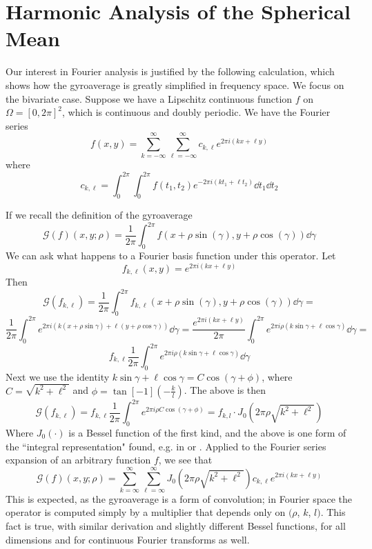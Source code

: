 \section{Harmonic Analysis of the Spherical Mean \label{sec:Harmonic2}}
Our interest in Fourier analysis is justified by the following calculation, which shows how the gyroaverage is greatly simplified in frequency space.  We focus on the bivariate case.  Suppose we have a Lipschitz continuous function $f$ on $\Omega = [0,2\pi]^2$, which is continuous and doubly periodic.  We have the Fourier series
\[ f(x,y) = \sum_{k=-\infty}^{\infty} \sum_{\ell = -\infty}^{\infty} c_{k,\ell} e^{2 \pi i (kx+\ell y)}  \]
where
\[ c_{k,\ell} = \int_{0}^{2 \pi} \int_{0}^{2 \pi} f(t_1,t_2) e^{-2 \pi i (kt_1 + \ell t_2)} \dd{t_1} \dd{t_2}\]

If we recall the definition of the gyroaverage
\[ \mathcal{G}(f)(x,y;\rho) = \frac{1}{2 \pi}\int_{0}^{2\pi} f(x+\rho \sin(\gamma), y + \rho \cos(\gamma)) \dd{\gamma}\]
We can ask what happens to a Fourier basis function under this operator.  Let
\[ f_{k, \ell} (x,y) = e^{2 \pi i (kx+\ell y)}   \]
Then
\[ \mathcal{G}(f_{k,\ell}) = \frac{1}{2 \pi}  \int_{0}^{2\pi} f_{k,\ell}(x+\rho \sin(\gamma), y + \rho \cos(\gamma)) \dd{\gamma} =  \]
\[  \frac{1}{2 \pi}  \int_{0}^{2\pi} e^{2 \pi i (k(x + \rho \sin \gamma) + \ell(y + \rho \cos \gamma))} \dd{\gamma} =   \frac{e^{2 \pi i (kx + \ell y)}}{2 \pi}\int_{0}^{2\pi} e^{2 \pi i \rho (k \sin \gamma + \ell \cos \gamma)} \dd{\gamma} =   \]
\[ f_{k,\ell} \frac{1}{2 \pi}\int_{0}^{2\pi} e^{2 \pi i \rho (k \sin \gamma + \ell \cos \gamma)} \dd{\gamma} \]
Next we use the identity $k \sin \gamma + \ell \cos \gamma = C \cos (\gamma + \phi)$, where $C = \sqrt{k^2 + \ell^2}$ and $\phi = \tan[-1](-\frac{k}{l})$.  The above is then 
\[ \mathcal{G}(f_{k,\ell}) = f_{k,\ell} \frac{1}{2 \pi} \int_{0}^{2 \pi} e^{2 \pi i \rho C \cos(\gamma + \phi)} = f_{k,l}  \cdot J_0(2 \pi \rho \sqrt{k^2 + \ell^2}) \]
Where $J_0(\cdot)$ is a Bessel function of the first kind, and the above is one form of the ``integral representation" found, e.g. in \cite{wikipediaBesselFunction} or \cite[Eq ~10.9.17]{NIST:DLMF}. 
Applied to the Fourier series expansion of an arbitrary function $f$, we see that
\[\mathcal{G}(f)(x,y;\rho) = \sum_{k=\infty}^{\infty} \sum_{\ell = \infty}^{\infty}  J_0(2 \pi \rho \sqrt{k^2 + \ell^2}) c_{k,\ell} e^{2 \pi i (kx+\ell y)}   \] 
This is expected, as the gyroaverage is a form of convolution; in Fourier space the operator is computed simply by a multiplier that depends only on $(\rho$, $k$, $l)$.  This fact is true, with similar derivation and slightly different Bessel functions, for all dimensions and for continuous Fourier transforms as well.

